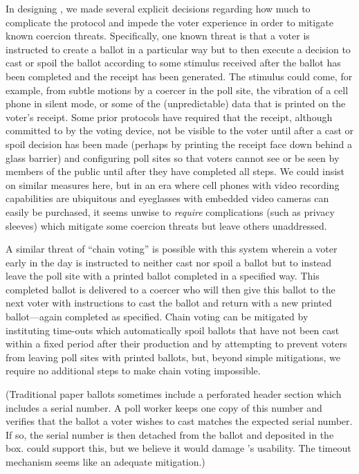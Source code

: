 \label{sec:coercion}

In designing \projname, we made several explicit decisions regarding how much to complicate the protocol and impede the voter experience in order to mitigate known coercion threats.  Specifically, one known threat is that a voter is instructed to create a ballot in a particular way but to then execute a decision to cast or spoil the ballot according to some stimulus received after the ballot has been completed and the receipt has been generated.  The stimulus could come, for example, from subtle motions by a coercer in the poll site, the vibration of a cell phone in silent mode, or some of the (unpredictable) data that is printed on the voter’s receipt.  Some prior protocols have required that the receipt, although committed to by the voting device, not be visible to the voter until after a cast or spoil decision has been made (perhaps by printing the receipt face down behind a glass barrier) and configuring poll sites so that voters cannot see or be seen by members of the public until after they have completed all steps.  We could insist on similar measures here, but in an era where cell phones with video recording capabilities are ubiquitous and eyeglasses with embedded video cameras can easily be purchased, it seems unwise to {\em require} complications (such as privacy sleeves) which mitigate some coercion threats but leave others unaddressed.

A similar threat of ``chain voting'' is possible with this system wherein a voter early in the day is instructed to neither cast nor spoil a ballot but to instead leave the poll site with a printed ballot completed in a specified way.  This completed ballot is delivered to a coercer who will then give this ballot to the next voter with instructions to cast the ballot and return with a new printed ballot---again completed as specified.  Chain voting can be mitigated by instituting time-outs which automatically spoil ballots that have not been cast within a fixed period after their production and by attempting to prevent voters from leaving poll sites with printed ballots, but, beyond simple mitigations, we require no additional steps to make chain voting impossible. 

(Traditional paper ballots sometimes include a perforated header section which includes a serial number. A poll worker keeps one copy of this number and verifies that the ballot a voter wishes to cast matches the expected serial number. If so, the serial number is then detached from the ballot and deposited in the box. \projname could support this, but we believe it would damage \projname's usability. The timeout mechanism seems like an adequate mitigation.)

